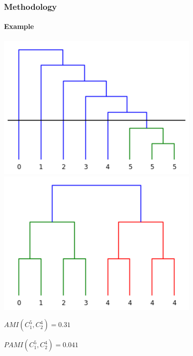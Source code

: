 \documentclass{tum-presentation}
\begin{document}
\begin{frame}
	\frametitle{Methodology}
	\framesubtitle{Example}
	\begin{center}
		\includegraphics[width = 10cm]{../figures/caterpilar_tree_level_5-1.png}\hspace{.5cm}\vline\hspace{.5cm}
		\includegraphics[width = 10cm]{../figures/binary_tree_level_4.png}
	\end{center}
	\begin{center}
		$AMI(C_1^{5}, C_2^{4}) = 0.31$
		
		$PAMI(C_1^{5}, C_2^{4}) = 0.041$
	\end{center}
\end{frame} 
\end{document}
